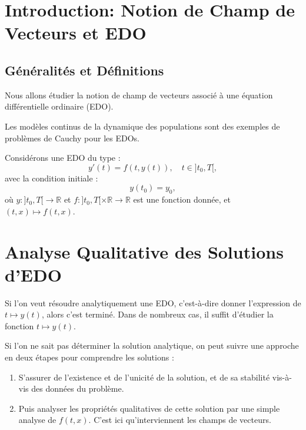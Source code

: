 \documentclass{article}
\begin{document}
\sloppy

\section{Introduction: Notion de Champ de Vecteurs et EDO}

\subsection{Généralités et Définitions}

Nous allons étudier la notion de champ de vecteurs associé à une équation différentielle ordinaire (EDO).

Les modèles continus de la dynamique des populations sont des exemples de problèmes de Cauchy pour les EDOs.

Considérons une EDO du type :
\begin{equation}
\label{eq:edo_generale}
y'(t) = f(t, y(t)), \quad t \in ]t_0, T[,
\end{equation}
avec la condition initiale :
\begin{equation}
\label{eq:condition_initiale}
y(t_0) = y_0,
\end{equation}
où $y : ]t_0, T[ \rightarrow \mathbb{R}$ et $f : ]t_0, T[ \times \mathbb{R} \rightarrow \mathbb{R}$ est une fonction donnée, et $(t, x) \mapsto f(t, x)$.

\section{Analyse Qualitative des Solutions d'EDO}

Si l'on veut résoudre analytiquement une EDO, c'est-à-dire donner l'expression de $t \mapsto y(t)$, alors c'est terminé. Dans de nombreux cas, il suffit d'étudier la fonction $t \mapsto y(t)$.

Si l'on ne sait pas déterminer la solution analytique, on peut suivre une approche en deux étapes pour comprendre les solutions :

\begin{enumerate}
    \item S'assurer de l'existence et de l'unicité de la solution, et de sa stabilité vis-à-vis des données du problème.
    \item Puis analyser les propriétés qualitatives de cette solution par une simple analyse de $f(t, x)$. C'est ici qu'interviennent les champs de vecteurs.
\end{enumerate}
\end{document}
